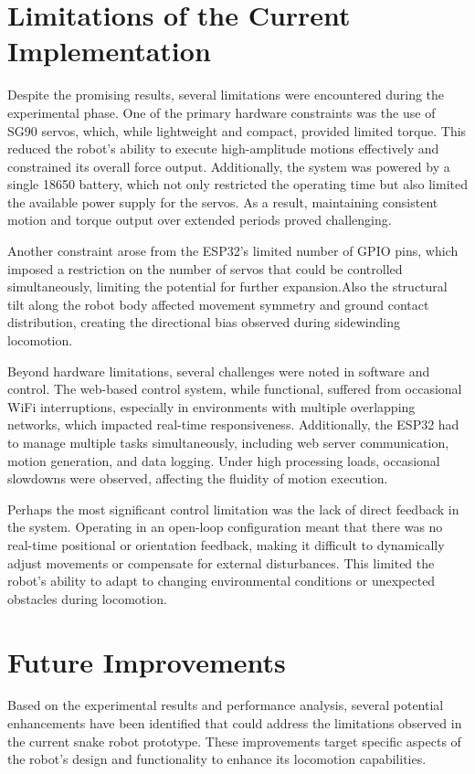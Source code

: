 \documentclass[12pt,a4paper]{report}
\begin{document}
\section{Limitations of the Current Implementation}
\label{sec:limitations}

Despite the promising results, several limitations were encountered during the experimental phase. One of the primary hardware constraints was the use of SG90 servos, which, while lightweight and compact, provided limited torque. This reduced the robot's ability to execute high-amplitude motions effectively and constrained its overall force output. Additionally, the system was powered by a single 18650 battery, which not only restricted the operating time but also limited the available power supply for the servos. As a result, maintaining consistent motion and torque output over extended periods proved challenging.

Another constraint arose from the ESP32's limited number of GPIO pins, which imposed a restriction on the number of servos that could be controlled simultaneously, limiting the potential for further expansion.Also the structural tilt along the robot body affected movement symmetry and ground contact distribution, creating the directional bias observed during sidewinding locomotion.

Beyond hardware limitations, several challenges were noted in software and control. The web-based control system, while functional, suffered from occasional WiFi interruptions, especially in environments with multiple overlapping networks, which impacted real-time responsiveness. Additionally, the ESP32 had to manage multiple tasks simultaneously, including web server communication, motion generation, and data logging. Under high processing loads, occasional slowdowns were observed, affecting the fluidity of motion execution.

Perhaps the most significant control limitation was the lack of direct feedback in the system. Operating in an open-loop configuration meant that there was no real-time positional or orientation feedback, making it difficult to dynamically adjust movements or compensate for external disturbances. This limited the robot's ability to adapt to changing environmental conditions or unexpected obstacles during locomotion.

\section{Future Improvements}
\label{sec:futureWork}
Based on the experimental results and performance analysis, several potential enhancements have been identified that could address the limitations observed in the current snake robot prototype. These improvements target specific aspects of the robot's design and functionality to enhance its locomotion capabilities.
\end{document}
